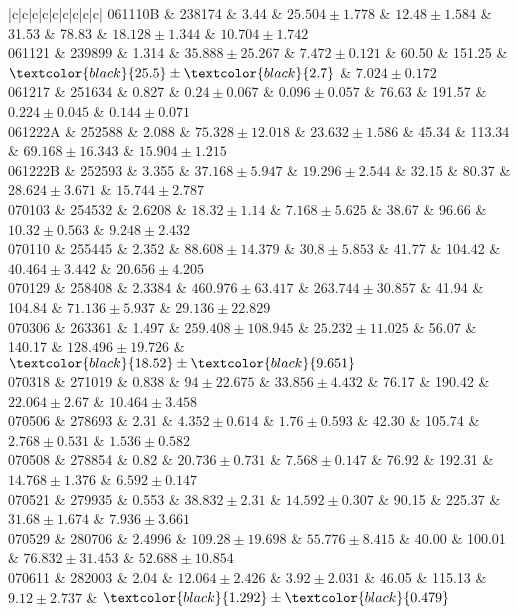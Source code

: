 \documentclass[prd,nofootinbib,preprintnumbers,floatfix]{revtex4}  %
\newcommand{\rthis}[1]{\textcolor{black}{#1}}
\begin{document}
\begin{center}
\begin{longtable*}{|c|c|c|c|c|c|c|c|c|}
061110B	&	238174	&	3.44	&	$	25.504	\pm	1.778	$	&	$	12.48	\pm	1.584	$	&	31.53	&	78.83	&	$	18.128	\pm	1.344	$	&	$	10.704	\pm	1.742	$	\\
061121	&	239899	&	1.314	&	$	35.888	\pm	25.267	$	&	$	7.472	\pm	0.121	$	&	60.50	&	151.25	&	$	\rthis{25.5}	\pm	\rthis{2.7}	$	&	$	7.024	\pm	0.172	$	\\
061217	&	251634	&	0.827	&	$	0.24	\pm	0.067	$	&	$	0.096	\pm	0.057	$	&	76.63	&	191.57	&	$	0.224	\pm	0.045	$	&	$	0.144	\pm	0.071	$	\\
061222A	&	252588	&	2.088	&	$	75.328	\pm	12.018	$	&	$	23.632	\pm	1.586	$	&	45.34	&	113.34	&	$	69.168	\pm	16.343	$	&	$	15.904	\pm	1.215	$	\\
061222B	&	252593	&	3.355	&	$	37.168	\pm	5.947	$	&	$	19.296	\pm	2.544	$	&	32.15	&	80.37	&	$	28.624	\pm	3.671	$	&	$	15.744	\pm	2.787	$	\\
070103	&	254532	&	2.6208	&	$	18.32	\pm	1.14	$	&	$	7.168	\pm	5.625	$	&	38.67	&	96.66	&	$	10.32	\pm	0.563	$	&	$	9.248	\pm	2.432	$	\\
070110	&	255445	&	2.352	&	$	88.608	\pm	14.379	$	&	$	30.8	\pm	5.853	$	&	41.77	&	104.42	&	$	40.464	\pm	3.442	$	&	$	20.656	\pm	4.205	$	\\
070129	&	258408	&	2.3384	&	$	460.976	\pm	63.417	$	&	$	263.744	\pm	30.857	$	&	41.94	&	104.84	&	$	71.136	\pm	5.937	$	&	$	29.136	\pm	22.829	$	\\
070306	&	263361	&	1.497	&	$	259.408	\pm	108.945	$	&	$	25.232	\pm	11.025	$	&	56.07	&	140.17	&	$	128.496	\pm	19.726	$	&	$	\rthis{18.52}	\pm	\rthis{9.651}	$	\\
070318	&	271019	&	0.838	&	$	94	\pm	22.675	$	&	$	33.856	\pm	4.432	$	&	76.17	&	190.42	&	$	22.064	\pm	2.67	$	&	$	10.464	\pm	3.458	$	\\
070506	&	278693	&	2.31	&	$	4.352	\pm	0.614	$	&	$	1.76	\pm	0.593	$	&	42.30	&	105.74	&	$	2.768	\pm	0.531	$	&	$	1.536	\pm	0.582	$	\\
070508	&	278854	&	0.82	&	$	20.736	\pm	0.731	$	&	$	7.568	\pm	0.147	$	&	76.92	&	192.31	&	$	14.768	\pm	1.376	$	&	$	6.592	\pm	0.147	$	\\
070521	&	279935	&	0.553	&	$	38.832	\pm	2.31	$	&	$	14.592	\pm	0.307	$	&	90.15	&	225.37	&	$	31.68	\pm	1.674	$	&	$	7.936	\pm	3.661	$	\\
070529	&	280706	&	2.4996	&	$	109.28	\pm	19.698	$	&	$	55.776	\pm	8.415	$	&	40.00	&	100.01	&	$	76.832	\pm	31.453	$	&	$	52.688	\pm	10.854	$	\\
070611	&	282003	&	2.04	&	$	12.064	\pm	2.426	$	&	$	3.92	\pm	2.031	$	&	46.05	&	115.13	&	$	9.12	\pm	2.737	$	&	$	\rthis{1.292}	\pm	\rthis{0.479}	$	\\

\end{longtable*}
\end{center}
\end{document}
